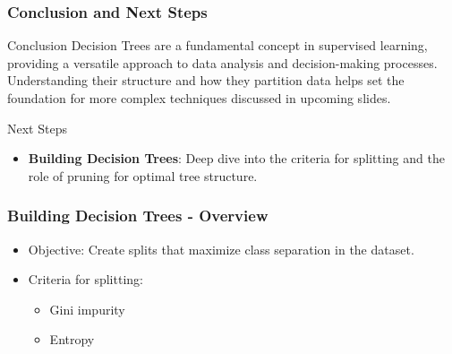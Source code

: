 \documentclass[aspectratio=169]{beamer}
\begin{document}
\begin{frame}[fragile]
    \frametitle{Conclusion and Next Steps}
    \begin{block}{Conclusion}
        Decision Trees are a fundamental concept in supervised learning, providing a versatile approach to data analysis and decision-making processes. Understanding their structure and how they partition data helps set the foundation for more complex techniques discussed in upcoming slides.
    \end{block}
    
    \begin{block}{Next Steps}
        \begin{itemize}
            \item \textbf{Building Decision Trees}: Deep dive into the criteria for splitting and the role of pruning for optimal tree structure.
        \end{itemize}
    \end{block}
\end{frame}

\begin{frame}[fragile]
    \frametitle{Building Decision Trees - Overview}
    \begin{itemize}
        \item Objective: Create splits that maximize class separation in the dataset.
        \item Criteria for splitting:
        \begin{itemize}
            \item Gini impurity
            \item Entropy
        \end{itemize}
    \end{itemize}
\end{frame}
\end{document}
